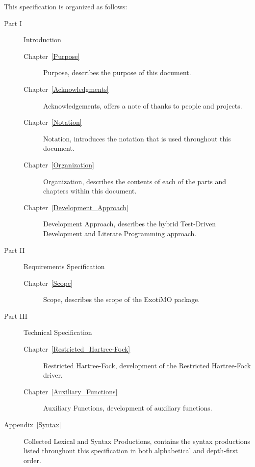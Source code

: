 \label{Organization}

This specification is organized as follows:

\begin{description}
\item[Part I] Introduction

\begin{description}
\item[Chapter~\ref{Purpose}] Purpose, describes the purpose of this document.

\item[Chapter~\ref{Acknowledgments}] Acknowledgements, offers a note of
thanks to people and projects.

\item[Chapter~\ref{Notation}] Notation, introduces the notation that is used
throughout this document.

\item[Chapter~\ref{Organization}] Organization, describes the contents of
each of the parts and chapters within this document.

\item[Chapter~\ref{Development_Approach}] Development Approach, describes the hybrid
Test-Driven Development and Literate Programming approach.
\end{description}

\item[Part II] Requirements Specification

\begin{description}
\item[Chapter~\ref{Scope}] Scope, describes the scope of the ExotiMO package.
\end{description}

\item[Part III] Technical Specification
\begin{description}
\item[Chapter~\ref{Restricted_Hartree-Fock}] Restricted Hartree-Fock, development of the 
Restricted Hartree-Fock driver.

\item[Chapter~\ref{Auxiliary_Functions}] Auxiliary Functions, development of auxiliary functions.
\end{description}

\item[Appendix~\ref{Syntax}] Collected Lexical and Syntax Productions,
contains the syntax productions listed throughout this specification
in both alphabetical and depth-first order.

\end{description}
